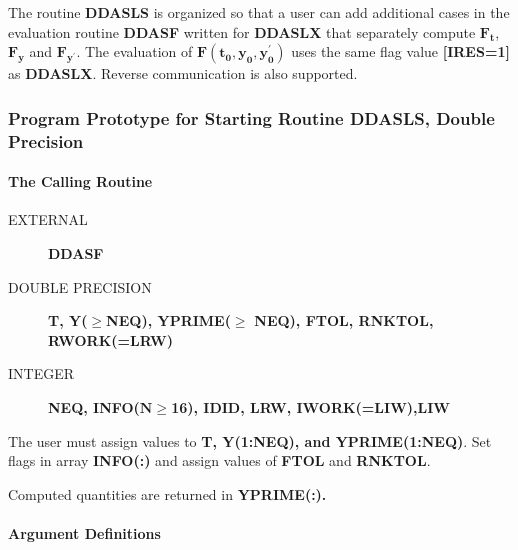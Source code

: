 \documentclass[twoside]{MATH77}
\begin{document}
 
The routine \textbf{DDASLS} is organized so that a user can add
additional cases in the evaluation routine \textbf{DDASF} written for
\textbf{DDASLX} that separately compute $\mathbf{F_t}$, $\mathbf{F_y}$
and $\mathbf{F_{y^{\prime}}}$.  The evaluation of
$\mathbf{F(t_0,y_0,y_0^{\prime})}$ uses the same flag value
\textbf{[IRES=1]} as \textbf{DDASLX}.  Reverse communication is also
supported.


\subsubsection{Program Prototype for Starting Routine DDASLS, Double Precision\label{PPGS}}
\paragraph{The Calling Routine\label{Calling1}}
\begin{description}
\item [EXTERNAL]\raggedright
  \textbf{DDASF}
\item[DOUBLE PRECISION] \quad\raggedright
  \textbf{T, Y(}$\mathbf{\geq}$\textbf{NEQ), YPRIME(}$\mathbf{\geq}$
  \textbf{NEQ), FTOL, RNKTOL,}
  \textbf{ RWORK(=LRW)}
\item[INTEGER]\quad\raggedright
  \textbf{NEQ, INFO(}$\mathbf{N \geq}$\textbf{16), IDID, LRW, IWORK(=LIW),LIW}
\end{description}
The user must assign values to \textbf{T, Y(1:NEQ), and YPRIME(1:NEQ)}.
  Set flags in array \textbf{INFO(:)} and assign values of
\textbf{FTOL} and \textbf{RNKTOL}.


Computed quantities are returned in \textbf{YPRIME(:).}
\paragraph{Argument Definitions \label{ArgDefs2}}
\end{document}

